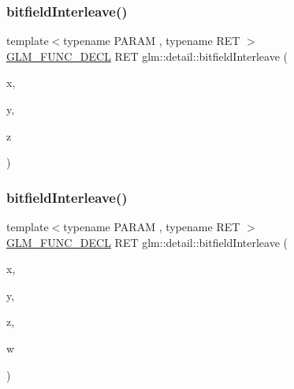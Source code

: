 \mbox{\label{namespaceglm_1_1detail_aa2fdd8f720417a13990873ba704a3426}} 
\subsubsection{\texorpdfstring{bitfield\+Interleave()}{bitfieldInterleave()}\hspace{0.1cm}{\footnotesize\ttfamily [2/11]}}
{\footnotesize\ttfamily template$<$typename P\+A\+R\+AM , typename R\+ET $>$ \\
\mbox{\hyperlink{setup_8hpp_ab2d052de21a70539923e9bcbf6e83a51}{G\+L\+M\+\_\+\+F\+U\+N\+C\+\_\+\+D\+E\+CL}} R\+ET glm\+::detail\+::bitfield\+Interleave (\begin{DoxyParamCaption}\item[{P\+A\+R\+AM}]{x,  }\item[{P\+A\+R\+AM}]{y,  }\item[{P\+A\+R\+AM}]{z }\end{DoxyParamCaption})}

\mbox{\label{namespaceglm_1_1detail_a606f6dc8c8314159fafef68f820c2c65}} 
\subsubsection{\texorpdfstring{bitfield\+Interleave()}{bitfieldInterleave()}\hspace{0.1cm}{\footnotesize\ttfamily [3/11]}}
{\footnotesize\ttfamily template$<$typename P\+A\+R\+AM , typename R\+ET $>$ \\
\mbox{\hyperlink{setup_8hpp_ab2d052de21a70539923e9bcbf6e83a51}{G\+L\+M\+\_\+\+F\+U\+N\+C\+\_\+\+D\+E\+CL}} R\+ET glm\+::detail\+::bitfield\+Interleave (\begin{DoxyParamCaption}\item[{P\+A\+R\+AM}]{x,  }\item[{P\+A\+R\+AM}]{y,  }\item[{P\+A\+R\+AM}]{z,  }\item[{P\+A\+R\+AM}]{w }\end{DoxyParamCaption})}

